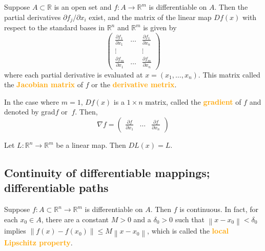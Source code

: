 \begin{theorem}
Suppose $A\subset \mathbb{R}$ is an open set and $f:A\to \mathbb{R}^m$ is differentiable on $A$. Then the partial derivatives $\partial f_j/\partial x_i$ exist, and the matrix of the linear map $Df(x)$ with respect to the standard bases in $\mathbb{R}^n$ and $\mathbb{R}^m$ is given by
\begingroup
\everymath{\displaystyle}
$$\begin{pmatrix}
    \frac{\partial f_1}{\partial x_1} & \dots & \frac{\partial f_1}{\partial x_n} \\
    \vdots & & \vdots \\
    \frac{\partial f_m}{\partial x_1} & \dots & \frac{\partial f_m}{\partial x_n}
\end{pmatrix}$$
\endgroup
where each partial derivative is evaluated at $x=(x_1,\dots,x_n)$. This matrix called the \textbf{\textcolor{orange}{Jacobian matrix}} of $f$ or the \textbf{\textcolor{orange}{derivative metrix}}.
\end{theorem}

\begin{definition}
In the case where $m=1$, $Df(x)$ is a $1\times n$ matrix, called the \textbf{\textcolor{orange}{gradient}} of $f$ and denoted by grad$f$ or $\   f$. Then,
\begingroup
\everymath{\displaystyle}
$$\nabla f = \begin{pmatrix}
    \frac{\partial f}{\partial x_1} & \dots & \frac{\partial f}{\partial x_n}
\end{pmatrix}$$
\endgroup
\end{definition}

\begin{example}
Let $L:\mathbb{R}^n\to \mathbb{R}^m$ be a linear map. Then $DL(x)=L$.
\end{example}

\subsection{Continuity of differentiable mappings; differentiable paths}

\begin{theorem}
Suppose $f:A\subset \mathbb{R}^n\to \mathbb{R}^m$ is differentiable on $A$. Then $f$ is continuous. In fact, for each $x_0\in A$, there are a constant $M>0$ and a $\delta_0>0$ such that $\left\|x-x_0\right\|<\delta_0$ implies $\left\|f(x)-f(x_0)\right\|\leq M\left\|x-x_0\right\|$, which is called the \textbf{\textcolor{orange}{local Lipschitz property}}.
\end{theorem}

